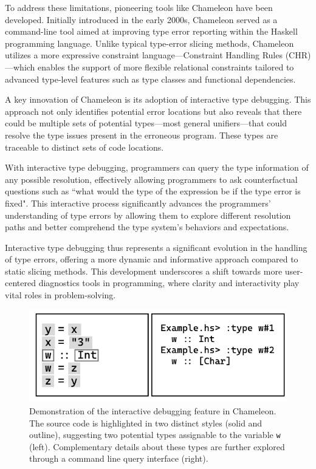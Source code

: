 To address these limitations, pioneering tools like Chameleon \cite{Stuckey2003-pz} have been developed. Initially introduced in the early 2000s, Chameleon served as a command-line tool aimed at improving type error reporting within the Haskell programming language. Unlike typical type-error slicing methods, Chameleon utilizes a more expressive constraint language—Constraint Handling Rules (CHR)—which enables the support of more flexible relational constraints tailored to advanced type-level features such as type classes and functional dependencies.

A key innovation of Chameleon is its adoption of interactive type debugging. This approach not only identifies potential error locations but also reveals that there could be multiple sets of potential types—most general unifiers—that could resolve the type issues present in the erroneous program. These types are traceable to distinct sets of code locations.

With interactive type debugging, programmers can query the type information of any possible resolution, effectively allowing programmers to ask counterfactual questions such as ``what would the type of the expression be if the type error is fixed". This interactive process significantly advances the programmers' understanding of type errors by allowing them to explore different resolution paths and better comprehend the type system's behaviors and expectations.

Interactive type debugging thus represents a significant evolution in the handling of type errors, offering a more dynamic and informative approach compared to static slicing methods. This development underscores a shift towards more user-centered diagnostics tools in programming, where clarity and interactivity play vital roles in problem-solving.

\begin{figure}[hbt]
  \includegraphics[width=0.8\linewidth]{ChameleonInteractive}
  \caption{
    \label{fig:chameleon-interactive}
    Demonstration of the interactive debugging feature in Chameleon. The source code is highlighted in two distinct styles (solid and outline), suggesting two potential types assignable to the variable \texttt{w} (left). Complementary details about these types are further explored through a command line query interface (right). }
\end{figure}

